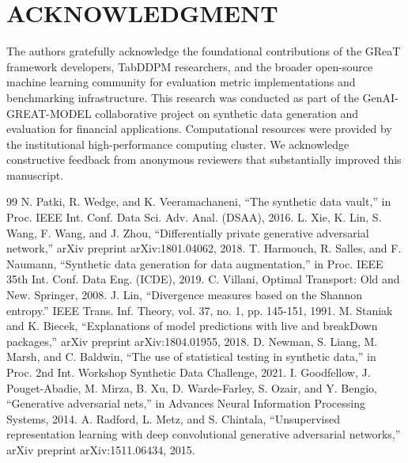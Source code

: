 \documentclass[10pt,conference,a4paper]{IEEEtran}
\begin{document}
\section*{ACKNOWLEDGMENT}
The authors gratefully acknowledge the foundational contributions of the GReaT framework developers, TabDDPM researchers, and the broader open-source machine learning community for evaluation metric implementations and benchmarking infrastructure. This research was conducted as part of the GenAI-GREAT-MODEL collaborative project on synthetic data generation and evaluation for financial applications. Computational resources were provided by the institutional high-performance computing cluster. We acknowledge constructive feedback from anonymous reviewers that substantially improved this manuscript.

\begin{thebibliography}{99}
 N. Patki, R. Wedge, and K. Veeramachaneni, ``The synthetic data vault,'' in Proc. IEEE Int. Conf. Data Sci. Adv. Anal. (DSAA), 2016.
 L. Xie, K. Lin, S. Wang, F. Wang, and J. Zhou, ``Differentially private generative adversarial network,'' arXiv preprint arXiv:1801.04062, 2018.
 T. Harmouch, R. Salles, and F. Naumann, ``Synthetic data generation for data augmentation,'' in Proc. IEEE 35th Int. Conf. Data Eng. (ICDE), 2019.
 C. Villani, Optimal Transport: Old and New. Springer, 2008.
 J. Lin, ``Divergence measures based on the Shannon entropy.'' IEEE Trans. Inf. Theory, vol. 37, no. 1, pp. 145-151, 1991.
 M. Staniak and K. Biecek, ``Explanations of model predictions with live and breakDown packages,'' arXiv preprint arXiv:1804.01955, 2018.
 D. Newman, S. Liang, M. Marsh, and C. Baldwin, ``The use of statistical testing in synthetic data,'' in Proc. 2nd Int. Workshop Synthetic Data Challenge, 2021.
 I. Goodfellow, J. Pouget-Abadie, M. Mirza, B. Xu, D. Warde-Farley, S. Ozair, and Y. Bengio, ``Generative adversarial nets,'' in Advances Neural Information Processing Systems, 2014.
 A. Radford, L. Metz, and S. Chintala, ``Unsupervised representation learning with deep convolutional generative adversarial networks,'' arXiv preprint arXiv:1511.06434, 2015.
\end{thebibliography}
\end{document}
